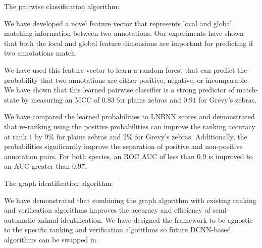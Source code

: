 \begin{enumln}
    \item {The pairwise classification algorithm}:
        \begin{enumln}

        \item We have developed a novel feature vector that represents local and global matching information
          between two annotations.
        Our experiments have shown that both the local and global feature dimensions are important for predicting
          if two annotations match.

        \item We have used this feature vector to learn a random forest that can predict the probability that two
          annotations are either positive, negative, or incomparable.
        We have shown that this learned pairwise classifier is a strong predictor of match-state by measuring an
          MCC of $0.83$ for plains zebras and $0.91$ for Grevy's zebras.

        \item We have compared the learned probabilities to LNBNN scores and demonstrated that re-ranking using
          the positive probabilities can improve the ranking accuracy at rank $1$ by $9\percent$ for plains zebras
          and $2\percent$ for Grevy's zebras.
        Additionally, the probabilities significantly improve the separation of positive and non-positive
          annotation pairs.
        For both species, an ROC AUC of less than $0.9$ is improved to an AUC greater than $0.97$.
          
        \end{enumln}

    \item {The graph identification algorithm}:
        \begin{enumln}

        \item 
            We have demonstrated that combining the graph algorithm with existing ranking and verification
              algorithms improves the accuracy and efficiency of semi-automatic animal identification.
            We have designed the framework to be agnostic to the specific ranking and verification algorithms so
              future DCNN-based algorithms can be swapped in.


\end{enumln}
\end{enumln}

